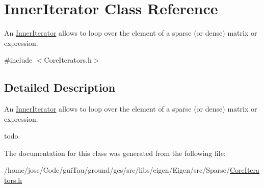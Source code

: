 \hypertarget{class_inner_iterator}{\section{Inner\-Iterator Class Reference}
\label{class_inner_iterator}
}


An \hyperlink{class_inner_iterator}{Inner\-Iterator} allows to loop over the element of a sparse (or dense) matrix or expression.  




{\ttfamily \#include $<$Core\-Iterators.\-h$>$}



\subsection{Detailed Description}
An \hyperlink{class_inner_iterator}{Inner\-Iterator} allows to loop over the element of a sparse (or dense) matrix or expression. 

todo 

The documentation for this class was generated from the following file\-:\begin{DoxyCompactItemize}
\item 
/home/jose/\-Code/gui\-Tau/ground/gcs/src/libs/eigen/\-Eigen/src/\-Sparse/\hyperlink{_core_iterators_8h}{Core\-Iterators.\-h}\end{DoxyCompactItemize}
